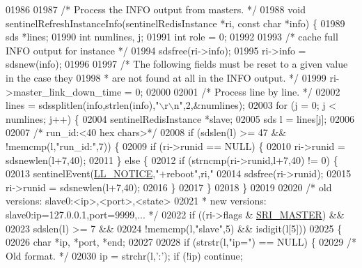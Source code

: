 \begin{DoxyCode}
{{{{{{{{{{{{{{{{{{{{{{{{{{{{{{{{{{{{{{{01986 
01987 \textcolor{comment}{/* Process the INFO output from masters. */}
01988 \textcolor{keywordtype}{void} sentinelRefreshInstanceInfo(sentinelRedisInstance *ri, \textcolor{keyword}{const} \textcolor{keywordtype}{char} *info) \{
01989     sds *lines;
01990     \textcolor{keywordtype}{int} numlines, j;
01991     \textcolor{keywordtype}{int} role = 0;
01992 
01993     \textcolor{comment}{/* cache full INFO output for instance */}
01994     sdsfree(ri->info);
01995     ri->info = sdsnew(info);
01996 
01997     \textcolor{comment}{/* The following fields must be reset to a given value in the case they}
01998 \textcolor{comment}{     * are not found at all in the INFO output. */}
01999     ri->master\_link\_down\_time = 0;
02000 
02001     \textcolor{comment}{/* Process line by line. */}
02002     lines = sdssplitlen(info,strlen(info),\textcolor{stringliteral}{"\(\backslash\)r\(\backslash\)n"},2,&numlines);
02003     \textcolor{keywordflow}{for} (j = 0; j < numlines; j++) \{
02004         sentinelRedisInstance *slave;
02005         sds l = lines[j];
02006 
02007         \textcolor{comment}{/* run\_id:<40 hex chars>*/}
02008         \textcolor{keywordflow}{if} (sdslen(l) >= 47 && !memcmp(l,\textcolor{stringliteral}{"run\_id:"},7)) \{
02009             \textcolor{keywordflow}{if} (ri->runid == NULL) \{
02010                 ri->runid = sdsnewlen(l+7,40);
02011             \} \textcolor{keywordflow}{else} \{
02012                 \textcolor{keywordflow}{if} (strncmp(ri->runid,l+7,40) != 0) \{
02013                     sentinelEvent(\hyperlink{server_8h_a8c54c191e436c7dd3012167212692401}{LL\_NOTICE},\textcolor{stringliteral}{"+reboot"},ri,\textcolor{stringliteral}{"%
02014                     sdsfree(ri->runid);
02015                     ri->runid = sdsnewlen(l+7,40);
02016                 \}
02017             \}
02018         \}
02019 
02020         \textcolor{comment}{/* old versions: slave0:<ip>,<port>,<state>}
02021 \textcolor{comment}{         * new versions: slave0:ip=127.0.0.1,port=9999,... */}
02022         \textcolor{keywordflow}{if} ((ri->flags & \hyperlink{sentinel_8c_a2ee83e5ff67b45746cd6a310f15334b2}{SRI\_MASTER}) &&
02023             sdslen(l) >= 7 &&
02024             !memcmp(l,\textcolor{stringliteral}{"slave"},5) && isdigit(l[5]))
02025         \{
02026             \textcolor{keywordtype}{char} *ip, *port, *end;
02027 
02028             \textcolor{keywordflow}{if} (strstr(l,\textcolor{stringliteral}{"ip="}) == NULL) \{
02029                 \textcolor{comment}{/* Old format. */}
02030                 ip = strchr(l,\textcolor{stringliteral}{':'}); \textcolor{keywordflow}{if} (!ip) \textcolor{keywordflow}{continue};
}}}}}}}}}}}}}}}}}}}}}}}}}}}}}}}}}}}}}}}}
\end{DoxyCode}
